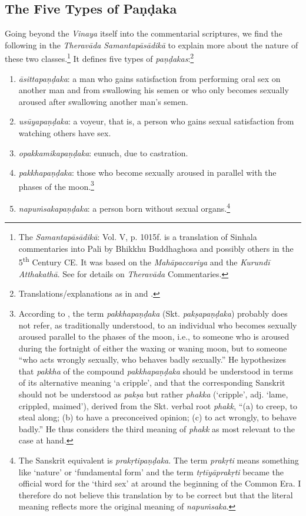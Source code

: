 \subsection{The Five Types of Paṇḍaka}
Going beyond the {\em Vinaya} itself into the commentarial scriptures, we find the following in the {\em Theravāda} {\em Samantapāsādikā} to explain more about the nature of these two classes.\footnote{The {\em Samantapāsādikā}: Vol. V, p. 1015f. is a translation of Sinhala commentaries into Pali by Bhikkhu Buddhaghosa and possibly others in the 5\textsuperscript{th} Century CE. It was based on the {\em Mahāpaccariya} and the {\em Kurundī Atthakathā}. See \cite{goonesekere} for details on {\em Theravāda} Commentaries.} It defines five types of {\em paṇḍakas}:\footnote{Translations/explanations as in \cite{bomhard} and \cite{thanissaro}.}

\begin{enumerate}
\item {\em āsittapaṇḍaka}: a man who gains satisfaction from performing oral sex on another man and from swallowing his semen or who only becomes sexually aroused after swallowing another man’s semen. 
\item {\em usūyapaṇḍaka}: a voyeur, that is, a person who gains sexual satisfaction from watching others have sex. 
\item {\em opakkamikapaṇḍaka}: eunuch, due to castration.
\item {\em pakkhapaṇḍaka}: those who become sexually aroused in parallel with the phases of the moon.\footnote{According to \cite{bomhard}, the term {\em pakkhapaṇḍaka} (Skt. {\em pakṣapaṇḍaka}) probably does not refer, as traditionally understood, to an individual who becomes sexually aroused parallel to the phases of the moon, i.e., to someone who is aroused during the fortnight of either the waxing or waning moon, but to someone ``who acts wrongly sexually, who behaves badly sexually.'' He hypothesizes that {\em pakkha} of the compound {\em pakkhapaṇḍaka} should be understood in terms of its alternative meaning `a cripple', and that the corresponding Sanskrit should not be understood as {\em pakṣa} but rather {\em phakka} (`cripple', adj. `lame, crippled, maimed'), derived from the Skt. verbal root {\em phakk}, ``(a) to creep, to steal along; (b) to have a preconceived opinion; (c) to act wrongly, to behave badly.'' He thus considers the third meaning of {\em phakk} as most relevant to the case at hand.}
\item {\em napuṁsakapaṇḍaka}: a person born without sexual organs.\footnote{The Sanskrit equivalent is {\em prakṛtipaṇḍaka}. The term {\em prakṛti} means something like `nature' or `fundamental form' and the term {\em tṛtīyāprakṛti} became the official word for the `third sex' at around the beginning of the Common Era. I therefore do not believe this translation by \cite{thanissaro} to be correct but that the literal meaning reflects more the original meaning of {\em napuṁsaka}.} 
\end{enumerate}

